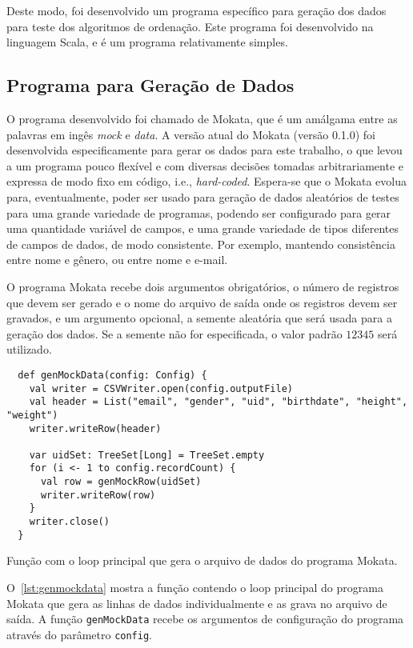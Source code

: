 \documentclass[a4paper,12pt]{scrartcl}
\begin{document}
Deste modo, foi desenvolvido um programa específico para geração dos dados para
teste dos algoritmos de ordenação. Este programa foi desenvolvido na linguagem
Scala, e é um programa relativamente simples.


\subsection{Programa para Geração de Dados}

O programa desenvolvido foi chamado de \textsf{Mokata}, que é um amálgama entre
as palavras em ingês \emph{mock} e \emph{data}. A versão atual do
\textsf{Mokata} (versão 0.1.0) foi desenvolvida especificamente para gerar os
dados para este trabalho, o que levou a um programa pouco flexível e com
diversas decisões tomadas arbitrariamente e expressa de modo fixo em código,
i.e., \emph{hard-coded}. Espera-se que o \textsf{Mokata} evolua para,
eventualmente, poder ser usado para geração de dados aleatórios de testes para
uma grande variedade de programas, podendo ser configurado para gerar uma
quantidade variável de campos, e uma grande variedade de tipos diferentes de
campos de dados, de modo consistente. Por exemplo, mantendo consistência entre
nome e gênero, ou entre nome e e-mail.

O programa \textsf{Mokata} recebe dois argumentos obrigatórios, o número de
registros que devem ser gerado e o nome do arquivo de saída onde os registros
devem ser gravados, e um argumento opcional, a semente aleatória que será usada
para a geração dos dados. Se a semente não for especificada, o valor padrão
$12345$ será utilizado.

\begin{listing}[h]
\begin{verbatim}
  def genMockData(config: Config) {
    val writer = CSVWriter.open(config.outputFile)
    val header = List("email", "gender", "uid", "birthdate", "height", "weight")
    writer.writeRow(header)

    var uidSet: TreeSet[Long] = TreeSet.empty
    for (i <- 1 to config.recordCount) {
      val row = genMockRow(uidSet)
      writer.writeRow(row)
    }
    writer.close()
  }
\end{verbatim}
\caption[Função de geração do arquivo de dados.]{Função com o loop principal
  que gera o arquivo de dados do programa \textsf{Mokata}.}
\label{lst:genmockdata}
\end{listing}

O~\autoref{lst:genmockdata} mostra a função contendo o loop principal do
programa \textsf{Mokata} que gera as linhas de dados individualmente e as grava
no arquivo de saída. A função \texttt{genMockData} recebe os
argumentos de configuração do programa através do parâmetro \texttt{config}.
\end{document}
